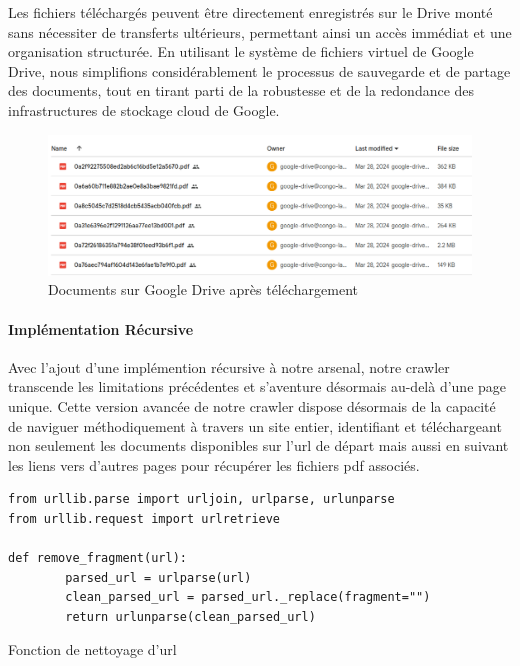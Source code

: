 Les fichiers téléchargés peuvent être directement enregistrés sur le Drive monté sans nécessiter de transferts ultérieurs, permettant ainsi un accès immédiat et une organisation structurée. En utilisant le système de fichiers virtuel de Google Drive, nous simplifions considérablement le processus de sauvegarde et de partage des documents, tout en tirant parti de la robustesse et de la redondance des infrastructures de stockage cloud de Google.

\begin{figure}[H]
    \centering
    \includegraphics[width=15cm]{gfx/fig-google-drive.png}
    \caption{Documents sur Google Drive après téléchargement}
    \label{fig:crawler-architecture}
\end{figure}

\paragraph{Implémentation Récursive} \hspace{0pt}

Avec l'ajout d'une implémention récursive à notre arsenal, notre crawler transcende les limitations précédentes et s'aventure désormais au-delà d'une page unique. Cette version avancée de notre crawler dispose désormais de la capacité de naviguer méthodiquement à travers un site entier, identifiant et téléchargeant non seulement les documents disponibles sur l'\ac{url} de départ mais aussi en suivant les liens vers d'autres pages pour récupérer les fichiers \ac{pdf} associés.

\begin{listing}[!ht]
\begin{verbatim}
from urllib.parse import urljoin, urlparse, urlunparse
from urllib.request import urlretrieve

def remove_fragment(url):
        parsed_url = urlparse(url)
        clean_parsed_url = parsed_url._replace(fragment="")
        return urlunparse(clean_parsed_url)
\end{verbatim}
\caption{Fonction de nettoyage d'\ac{url}}
\label{appendix:code:python:remove-fragment}
\end{listing}

